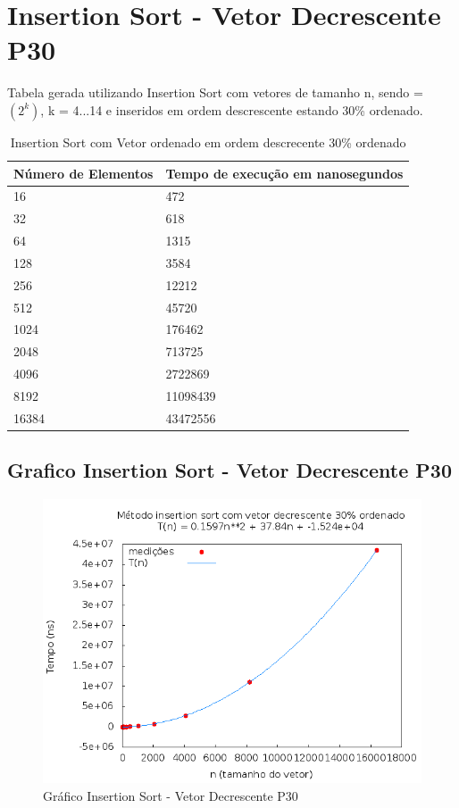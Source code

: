 \documentclass[12pt,a4paper,twoside]{report}
\begin{document}
\section{Insertion Sort - Vetor Decrescente P30}
Tabela gerada utilizando Insertion Sort com vetores de tamanho n, sendo = $(2^k)$, k = 4...14 e inseridos em ordem descrescente estando 30\% ordenado.

\begin{table}[H]
\centering
\caption{Insertion Sort com Vetor ordenado em ordem descrecente 30\% ordenado}
\label{my-label}
\begin{tabular}{|l|l|}
\hline
\multicolumn{1}{|c|}{\textbf{Número de Elementos}} & \multicolumn{1}{c|}{\textbf{Tempo de execução em nanosegundos}} \\ \hline
16 & 472 \\ \hline
32 & 618 \\ \hline
64 & 1315 \\ \hline
128 & 3584 \\ \hline
256 & 12212 \\ \hline
512 & 45720 \\ \hline
1024 & 176462 \\ \hline
2048 & 713725 \\ \hline
4096 & 2722869 \\ \hline
8192 & 11098439 \\ \hline
16384 & 43472556 \\ \hline
\end{tabular}
\end{table}

\subsection{Grafico Insertion Sort - Vetor Decrescente P30}
\begin{figure}[H]
    \centering
    \includegraphics[width=0.7\linewidth]{graficos/Insertion/vIntDecrescenteP30/vIntDecrescenteP30.png}
  \caption{Gráfico Insertion Sort - Vetor Decrescente P30}
\end{figure}
\end{document}
